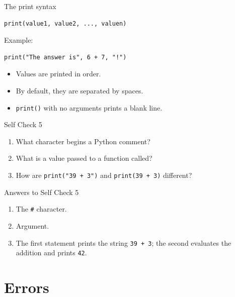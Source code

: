 \documentclass[aspectratio=169,10pt]{beamer}
\begin{document}
\begin{frame}[fragile]{The print syntax}
\begin{lstlisting}
print(value1, value2, ..., valuen)
\end{lstlisting}

Example:

\begin{lstlisting}
print("The answer is", 6 + 7, "!")
\end{lstlisting}

\begin{itemize}
  \item Values are printed in order.
  \item By default, they are separated by spaces.
  \item \texttt{print()} with no arguments prints a blank line.
\end{itemize}
\end{frame}

\begin{frame}{Self Check 5}
\begin{enumerate}
  \item What character begins a Python comment?
  \item What is a value passed to a function called?
  \item How are \texttt{print("39 + 3")} and \texttt{print(39 + 3)} different?
\end{enumerate}
\end{frame}

\begin{frame}{Answers to Self Check 5}
\begin{enumerate}
  \item The \texttt{\#} character.
  \item Argument.
  \item The first statement prints the string \texttt{39 + 3}; the second evaluates the addition and prints \texttt{42}.
\end{enumerate}
\end{frame}

\section{Errors}
\end{document}
